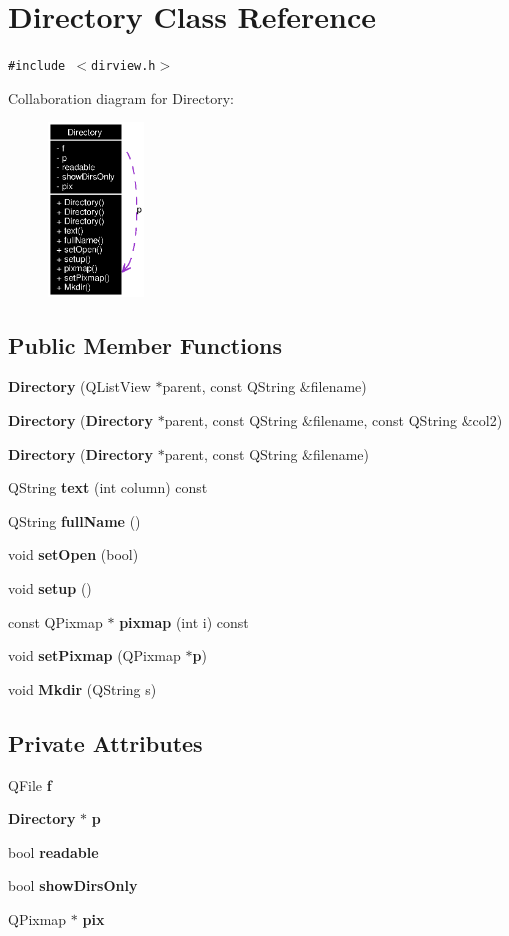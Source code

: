 \section{Directory Class Reference}
\label{classDirectory}
{\tt \#include $<$dirview.h$>$}

Collaboration diagram for Directory:\begin{figure}[H]
\begin{center}
\leavevmode
\includegraphics[width=72pt]{classDirectory__coll__graph}
\end{center}
\end{figure}
\subsection*{Public Member Functions}
\begin{CompactItemize}
\item 
{\bf Directory} (QList\-View $\ast$parent, const QString \&filename)
\item 
{\bf Directory} ({\bf Directory} $\ast$parent, const QString \&filename, const QString \&col2)
\item 
{\bf Directory} ({\bf Directory} $\ast$parent, const QString \&filename)
\item 
QString {\bf text} (int column) const 
\item 
QString {\bf full\-Name} ()
\item 
void {\bf set\-Open} (bool)
\item 
void {\bf setup} ()
\item 
const QPixmap $\ast$ {\bf pixmap} (int i) const 
\item 
void {\bf set\-Pixmap} (QPixmap $\ast${\bf p})
\item 
void {\bf Mkdir} (QString s)
\end{CompactItemize}
\subsection*{Private Attributes}
\begin{CompactItemize}
\item 
QFile {\bf f}
\item 
{\bf Directory} $\ast$ {\bf p}
\item 
bool {\bf readable}
\item 
bool {\bf show\-Dirs\-Only}
\item 
QPixmap $\ast$ {\bf pix}
\end{CompactItemize}



